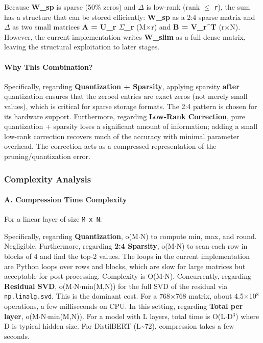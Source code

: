 Because \textbf{W\_sp} is sparse (50\% zeros) and \textbf{$\Delta$} is low-rank (rank $\le$ \texttt{r}), the sum has a structure that can be stored efficiently: \textbf{W\_sp} as a 2:4 sparse matrix and \textbf{$\Delta$} as two small matrices \textbf{A = U\_r $\Sigma$\_r} (M$\times$r) and \textbf{B = V\_r\textasciicircum{}T} (r$\times$N). However, the current implementation writes \textbf{W\_slim} as a full dense matrix, leaving the structural exploitation to later stages.

\paragraph{Why This Combination?}

Specifically, regarding \textbf{Quantization + Sparsity}, applying sparsity \textbf{after} quantization ensures that the zeroed entries are exact zeros (not merely small values), which is critical for sparse storage formats. The 2:4 pattern is chosen for its hardware support. Furthermore, regarding \textbf{Low-Rank Correction}, pure quantization + sparsity loses a significant amount of information; adding a small low-rank correction recovers much of the accuracy with minimal parameter overhead. The correction acts as a compressed representation of the pruning/quantization error.



\subsubsection*{Complexity Analysis}

\paragraph{A. Compression Time Complexity}

For a linear layer of size \texttt{M x N}:

Specifically, regarding \textbf{Quantization}, o(M$\cdot$N) to compute min, max, and round. Negligible. Furthermore, regarding \textbf{2:4 Sparsity}, o(M$\cdot$N) to scan each row in blocks of 4 and find the top-2 values. The loops in the current implementation are Python loops over rows and blocks, which are slow for large matrices but acceptable for post-processing. Complexity is O(M$\cdot$N). Concurrently, regarding \textbf{Residual SVD}, o(M$\cdot$N$\cdot$min(M,N)) for the full SVD of the residual via \texttt{np.linalg.svd}. This is the dominant cost. For a 768$\times$768 matrix, about 4.5$\times$10$^8$ operations, a few milliseconds on CPU. In this setting, regarding \textbf{Total per layer}, o(M$\cdot$N$\cdot$min(M,N)). For a model with L layers, total time is O(L$\cdot$D$^3$) where D is typical hidden size. For DistilBERT (L\textasciitilde{}72), compression takes a few seconds.


